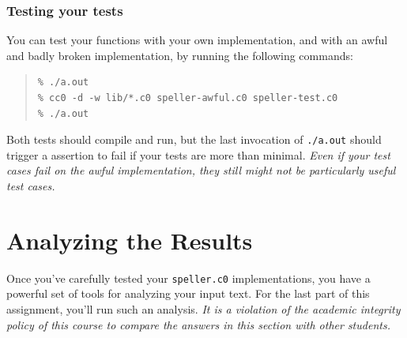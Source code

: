 \documentclass[12pt]{exam}
\begin{document}
\subsubsection*{Testing your tests}
You can test your functions with your own implementation, and with an
awful and badly broken implementation, by running the following
commands:

\begin{quote}
\begin{lstlisting}[language={[coin]C}, aboveskip=1pt, belowskip=0pt, basicstyle=\smallbasicstyle]
% cc0 -d -w lib/*.c0 speller.c0 speller-test.c0
% ./a.out
% cc0 -d -w lib/*.c0 speller-awful.c0 speller-test.c0
% ./a.out
\end{lstlisting}
\end{quote}
Both tests should compile and run, but the last invocation of
\lstinline'./a.out' should trigger a assertion to fail if your tests are
more than minimal. \emph{Even if your test cases fail on the
  awful implementation, they still might not be particularly useful
  test cases.}



\newpage
\section{Analyzing the Results}
\newcommand{\redacted}
 {\underline{\hspace{1.5em}}\mathtt{REDACTED}\underline{\hspace{1.5em}}}

Once you've carefully tested your \lstinline'speller.c0' implementations,
you have a powerful set of tools for analyzing your input text. For
the last part of this assignment, you'll run such an analysis.
\emph{It is a violation of the academic integrity policy of this
  course to compare the answers in this section with other students.}
\end{document}
